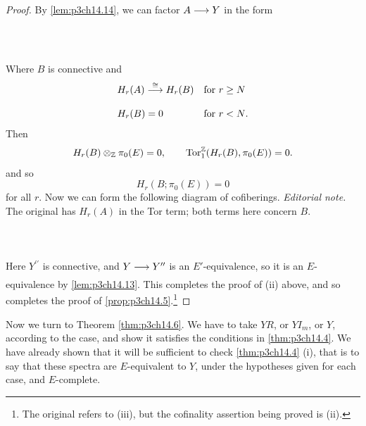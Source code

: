 \documentclass[../main]{subfiles}
\begin{document}
\begin{lemma}
\begin{proof}
  By \ref{lem:p3ch14.14}, we can factor $A\lar{} Y$ in the form
  ~\\~\\
  ~\\~\\
 Where $B$ is connective and 
 \begin{align*}
   &H_{r}(A) \vra{\cong} H_{r}(B)  &&\text{for $r\ge N$}\\[0.5em]
   &H_{r}(B) =  0    &&\text{for $r < N$}.
 \end{align*} 
 Then 
 \[
 H_{r}(B) \otimes_{\mathbb{Z}} \pi_{0}(E)=0, \qquad \mathrm{Tor}^{\mathbb{Z}}_{1}(H_{r}(B),\pi_{0}(E))=0.
 \] 
 and so 
 \[
   H_{r}(B; \pi_{0}(E))=0 
 \] 
 for all $r$. Now we can form the following diagram of cofiberings.
\noindent\textit{Editorial note.} The original has $H_r(A)$ in the Tor term; both terms here concern $B$.
 ~\\~\\
 ~\\~\\
 Here $Y^{\prime\prime}$ is connective, and $Y \lar{} Y^{\prime\prime}$ is an $E'$-equivalence, so it is an $E$-equivalence by \ref{lem:p3ch14.13}. This completes the proof of (ii) above, and so completes the proof of \ref{prop:p3ch14.5}.\footnote{The original refers to (iii), but the cofinality assertion being proved is (ii).}
\end{proof}
\end{lemma}

Now we turn to Theorem \ref{thm:p3ch14.6}. We have to take $YR$, or  $YI_{m}$, or $Y$, according to the case, and show it satisfies the conditions in \ref{thm:p3ch14.4}. We have already shown that it will be sufficient to check \ref{thm:p3ch14.4} (i), that is to say that these spectra are $E$-equivalent to $Y$, under the hypotheses given for each case, and $E$-complete. 
\end{document}
